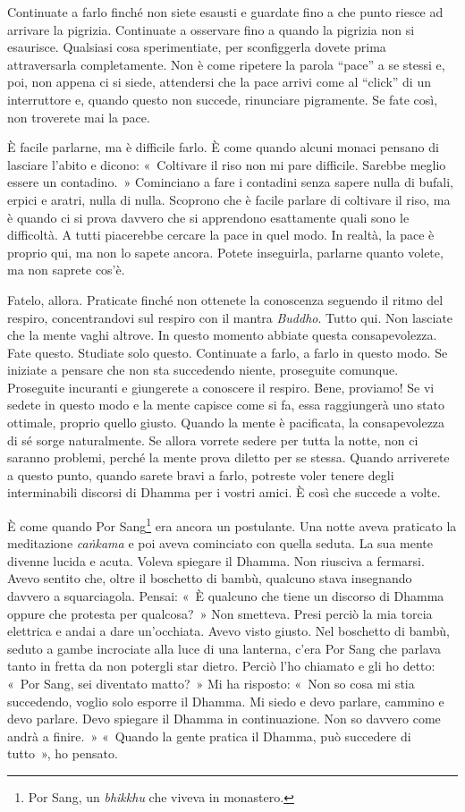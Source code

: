 Continuate a farlo finché non siete esausti e guardate fino a che punto
riesce ad arrivare la pigrizia. Continuate a osservare fino a quando la
pigrizia non si esaurisce. Qualsiasi cosa sperimentiate, per
sconfiggerla dovete prima attraversarla completamente. Non è come
ripetere la parola ``pace'' a se stessi e, poi, non appena ci si siede,
attendersi che la pace arrivi come al ``click'' di un interruttore e,
quando questo non succede, rinunciare pigramente. Se fate così, non
troverete mai la pace.

È facile parlarne, ma è difficile farlo. È come quando alcuni monaci
pensano di lasciare l'abito e dicono: «~Coltivare il riso non mi pare
difficile. Sarebbe meglio essere un contadino.~» Cominciano a fare i
contadini senza sapere nulla di bufali, erpici e aratri, nulla di nulla.
Scoprono che è facile parlare di coltivare il riso, ma è quando ci si
prova davvero che si apprendono esattamente quali sono le difficoltà. A
tutti piacerebbe cercare la pace in quel modo. In realtà, la pace è
proprio qui, ma non lo sapete ancora. Potete inseguirla, parlarne quanto
volete, ma non saprete cos'è.

Fatelo, allora. Praticate finché non ottenete la conoscenza seguendo il
ritmo del respiro, concentrandovi sul respiro con il mantra
\emph{Buddho}. Tutto qui. Non lasciate che la mente vaghi altrove. In
questo momento abbiate questa consapevolezza. Fate questo. Studiate solo
questo. Continuate a farlo, a farlo in questo modo. Se iniziate a
pensare che non sta succedendo niente, proseguite comunque. Proseguite
incuranti e giungerete a conoscere il respiro. Bene, proviamo! Se vi
sedete in questo modo e la mente capisce come si fa, essa raggiungerà
uno stato ottimale, proprio quello giusto. Quando la mente è pacificata,
la consapevolezza di sé sorge naturalmente. Se allora vorrete sedere per
tutta la notte, non ci saranno problemi, perché la mente prova diletto
per se stessa. Quando arriverete a questo punto, quando sarete bravi a
farlo, potreste voler tenere degli interminabili discorsi di Dhamma per
i vostri amici. È così che succede a volte.

È come quando Por Sang\footnote{Por Sang, un \emph{bhikkhu} che viveva
  in monastero.} era ancora un postulante. Una notte aveva praticato la
meditazione \emph{caṅkama} e poi aveva cominciato con quella seduta. La
sua mente divenne lucida e acuta. Voleva spiegare il Dhamma. Non
riusciva a fermarsi. Avevo sentito che, oltre il boschetto di bambù,
qualcuno stava insegnando davvero a squarciagola. Pensai: «~È qualcuno
che tiene un discorso di Dhamma oppure che protesta per qualcosa?~» Non
smetteva. Presi perciò la mia torcia elettrica e andai a dare
un'occhiata. Avevo visto giusto. Nel boschetto di bambù, seduto a gambe
incrociate alla luce di una lanterna, c'era Por Sang che parlava tanto
in fretta da non potergli star dietro. Perciò l'ho chiamato e gli ho
detto: «~Por Sang, sei diventato matto?~» Mi ha risposto: «~Non so cosa
mi stia succedendo, voglio solo esporre il Dhamma. Mi siedo e devo
parlare, cammino e devo parlare. Devo spiegare il Dhamma in
continuazione. Non so davvero come andrà a finire.~» «~Quando la gente
pratica il Dhamma, può succedere di tutto~», ho pensato.

